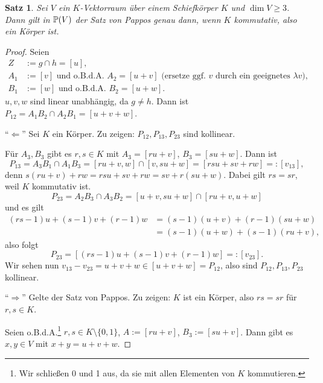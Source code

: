 \documentclass[
 a4paper,
 12pt,
 parskip=half
 ]{scrartcl}
\theoremstyle{plain}
\newtheorem{thm}{Satz}[section] %
\theoremstyle{definition}
\begin{document}
\begin{thm}
 Sei $V$ ein $K$-Vektorraum über einem Schiefkörper $K$ und $\dim V \ge 3$. Dann gilt in $\mathbb{P}(V)$ der Satz von Pappos genau dann, wenn $K$ kommutativ, also ein Körper ist.
\end{thm}

\begin{proof}
 Seien 
 \[ \begin{aligned}
     Z   &:= g \cap h = [u], \\
     A_1 &:= [v] \text{ und o.B.d.A. } A_2 = [u + v] \text{ (ersetze ggf. $v$ durch ein geeignetes $\lambda v$)}, \\
     B_1 &:= [w] \text{ und o.B.d.A. } B_2 = [u + w].
    \end{aligned} \]
 $u, v, w$ sind linear unabhängig, da $g \ne h$. Dann ist $P_{12} = A_1 B_2 \cap A_2 B_1 = [u + v + w]$. 
 
 ``$\Leftarrow$'' Sei $K$ ein Körper. Zu zeigen: $P_{12}, P_{13}, P_{23}$ sind kollinear.
 
 Für $A_3, B_3$ gibt es $r, s \in K$ mit $A_3 = [ru+v]$, $B_3 = [su+w]$. Dann ist 
 \[ P_{13} = A_3 B_1 \cap A_1 B_3 = [ru + v, w] \cap [v, su + w] = [rsu+sv+rw] =: [v_{13}], \]
 denn $s(ru+v) + rw = rsu + sv + rw = sv + r(su + w)$. Dabei gilt $rs = sr$, weil $K$ kommutativ ist.
 \[ P_{23} = A_2 B_3 \cap A_3 B_2 = [u+v, su + w] \cap [ru + v, u+w] \]
 und es gilt
 \[ \begin{aligned}
    (rs-1)u + (s-1)v + (r-1)w 
    &= (s-1) (u+v) + (r-1)(su +w) \\
    &= (s-1)(u+w) + (s-1)(ru+v),
    \end{aligned} \]
 also folgt
 \[ P_{23} = [ (rs-1)u + (s-1)v + (r-1)w ] =: [v_{23}]. \]
 Wir sehen nun $v_{13} - v_{23} = u + v + w \in [u + v + w] = P_{12}$, also sind $P_{12}, P_{13}, P_{23}$ kollinear.
 
 ``$\Rightarrow$'' Gelte der Satz von Pappos. Zu zeigen: $K$ ist ein Körper, also $rs = sr$ für $r,s \in K$.
 
 Seien o.B.d.A.\footnote{Wir schließen 0 und 1 aus, da sie mit allen Elementen von $K$ kommutieren.} $r,s \in K \setminus \{ 0, 1 \}$, $A := [ru+v]$, $B_3 := [su+v]$. Dann gibt es $x,y \in V$ mit $x+y = u + v + w$.
 

\end{proof}
\end{document}
